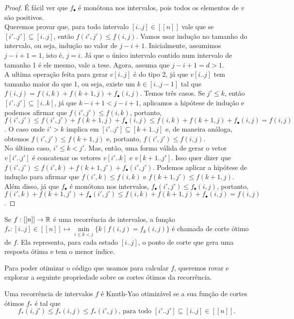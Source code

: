 \begin{proof}
É fácil ver que $f_\bullet$ é monótona nos intervalos, pois todos os elementos de $v$ são positivos. \\
Queremos provar que, para todo intervalo $[i..j] \in [[n]]$ vale que se $[i'..j'] \subseteq [i..j]$, então $f(i',j') \leq f(i,j)$. Vamos usar indução no tamanho do intervalo, ou seja, indução no valor de $j - i + 1$. Inicialmente, assumimos $j - i + 1 = 1$, isto é, $j = i$. Já que o único intervalo contido num intervalo de tamanho 1 é ele mesmo, vale a tese. Agora, assuma que $j - i + 1 = d > 1$. \\
A ultima operação feita para gerar $v[i..j]$ é do tipo 2, já que $v[i..j]$ tem tamanho maior do que 1, ou seja, existe um $k \in [i..j-1]$ tal que $f(i,j) = f(i,k) + f(k+1,j) + f_\bullet(i,j)$. Temos três casos. Se $j' \leq k$, então $[i'..j'] \subseteq [i..k]$, já que $k - i + 1 < j - i + 1$, aplicamos a hipótese de indução e podemos afirmar que $f(i',j') \leq f(i,k)$, portanto, $f(i',j') \leq f(i',j') + f(k+1,j) + f_\bullet(i,j) \leq f(i,k) + f(k+1,j) + f_\bullet(i,j) = f(i,j)$. O caso onde $i' > k$ implica em $[i'..j'] \subseteq [k+1..j]$ e, de maneira análoga, obtemos $f(i',j') \leq f(k+1,j)$ e, portanto, $f(i',j') \leq f(i,j)$. \\
No último caso, $i' \leq k < j'$. Mas, então, uma forma válida de gerar o vetor $v[i'..j']$ é concatenar os vetores $v[i'..k]$ e $v[k+1..j']$. Isso quer dizer que $f(i',j') \leq f(i',k) + f(k+1,j') + f_\bullet(i',j')$. Podemos aplicar a hipótese de indução para afirmar que $f(i',k) \leq f(i,k)$ e $f(k+1,j') \leq f(k+1,j)$. Além disso, já que $f_\bullet$ é monótona nos intervalos, $f_\bullet(i',j') \leq f_\bullet(i,j)$, portanto, $f(i',k) + f(k+1,j') + f_\bullet(i',j') \leq f(i,k) + f(k+1,j) + f_\bullet(i,j) = f(i,j)$.
\end{proof}

\begin{defi}
Se $f : [[n]] \to \mathbb{R}$ é uma recorrência de intervalos, a função $f_* : [i..j] \in [[n]] \mapsto \min\limits_{i \leq k < j} \Big\{ k \mid f(i,j) = f_k(i,j) \Big\}$ é chamada de corte ótimo de $f$. Ela representa, para cada estado $[i..j]$, o ponto de corte que gera uma resposta ótima e tem o menor índice. 
\end{defi}

Para poder otimizar o código que usamos para calcular $f$, queremos rovar e explorar a seguinte propriedade sobre os cortes ótimos da recorrência.

\begin{defi} \label{knuthyao}
Uma recorrência de intervalos $f$ é Knuth-Yao otimizável se a sua função de cortes ótimos $f_*$ é tal que
$$f_*(i,j') \leq f_*(i,j) \leq f_*(i',j) \text{, para todo } [i'..j'] \subseteq [i..j] \in [[n]] \text{.}$$
\end{defi}

